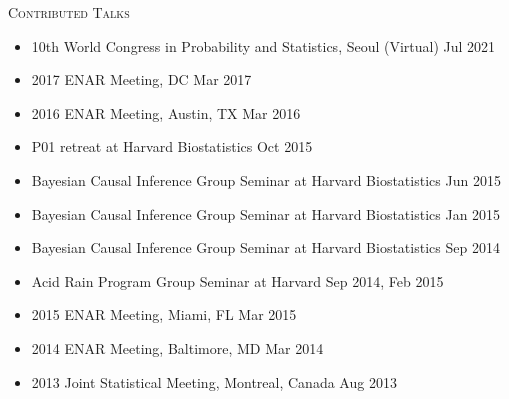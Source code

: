 \documentclass[10pt]{article}
\newenvironment{innerlist}[1][\enskip\textbullet]%
        {\begin{itemize}[#1,leftmargin=*,parsep=0pt,itemsep=0pt,topsep=0pt,partopsep=0pt]}
        {\end{itemize}}
\begin{document}
\textsc{Contributed Talks}
\smallskip
\begin{innerlist}
\item[] 10th World Congress in Probability and Statistics, Seoul (Virtual) \hfill Jul 2021\\
\item[] 2017 ENAR Meeting, DC
  \hfill Mar 2017\\
\item[] 2016 ENAR Meeting, Austin, TX
  \hfill Mar 2016\\
\item[] P01 retreat at Harvard Biostatistics
  \hfill Oct 2015\\
\item[] Bayesian Causal Inference Group Seminar at Harvard Biostatistics  \hfill Jun 2015\\
\item[] Bayesian Causal Inference Group Seminar at Harvard Biostatistics  \hfill Jan 2015\\
\item[] Bayesian Causal Inference Group Seminar at Harvard Biostatistics  \hfill Sep 2014\\
\item[] Acid Rain Program Group Seminar at Harvard
  \hfill Sep 2014, Feb 2015\\
\item[] 2015 ENAR Meeting, Miami, FL
  \hfill Mar 2015\\
\item[] 2014 ENAR Meeting, Baltimore, MD
  \hfill Mar 2014\\
\item[] 2013 Joint Statistical Meeting, Montreal, Canada
  \hfill Aug 2013\\
\end{innerlist}
\end{document}

